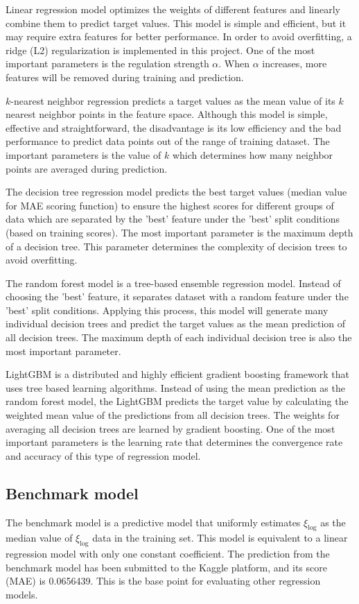\documentclass[12pt]{article}
\begin{document}
Linear regression model optimizes the weights of different features and linearly combine them to predict target values. This model is simple and efficient, but it may require extra features for better performance. In order to avoid overfitting, a ridge (L2) regularization is implemented in this project. One of the most important parameters is the regulation strength $\alpha$. When $\alpha$ increases, more features will be removed during training and prediction.

$k$-nearest neighbor regression predicts a target values as the mean value of its $k$ nearest neighbor points in the feature space. Although this model is simple, effective and straightforward, the disadvantage is its low efficiency and the bad performance to predict data points out of the range of training dataset. The important parameters is the value of $k$ which determines how many neighbor points are averaged during prediction.

The decision tree regression model predicts the best target values (median value for MAE scoring function) to ensure the highest scores for different groups of data which are separated by the 'best' feature under the 'best' split conditions (based on training scores). The most important parameter is the maximum depth of a decision tree. This parameter determines the complexity of decision trees to avoid overfitting.

The random forest model is a tree-based ensemble regression model. Instead of choosing the 'best' feature, it separates dataset with a random feature under the 'best' split conditions. Applying this process, this model will generate many individual decision trees and predict the target values as the mean prediction of all decision trees. The maximum depth of each individual decision tree is also the most important parameter.

LightGBM is a distributed and highly efficient gradient boosting framework that uses tree based learning algorithms. Instead of using the mean prediction as the random forest model, the LightGBM predicts the target value by calculating the weighted mean value of the predictions from all decision trees. The weights for averaging all decision trees are learned by gradient boosting. One of the most important parameters is the learning rate that determines the convergence rate and accuracy of this type of regression model. 

\subsection{Benchmark model}
The benchmark model is a predictive model that uniformly estimates $\xi_{\log}$ as the median value of $\xi_{\log}$ data in the training set. This model is equivalent to a linear regression model with only one constant coefficient. The prediction from the benchmark model has been submitted to the Kaggle platform, and its score (MAE) is 0.0656439. This is the base point for evaluating other regression models.
\end{document}
